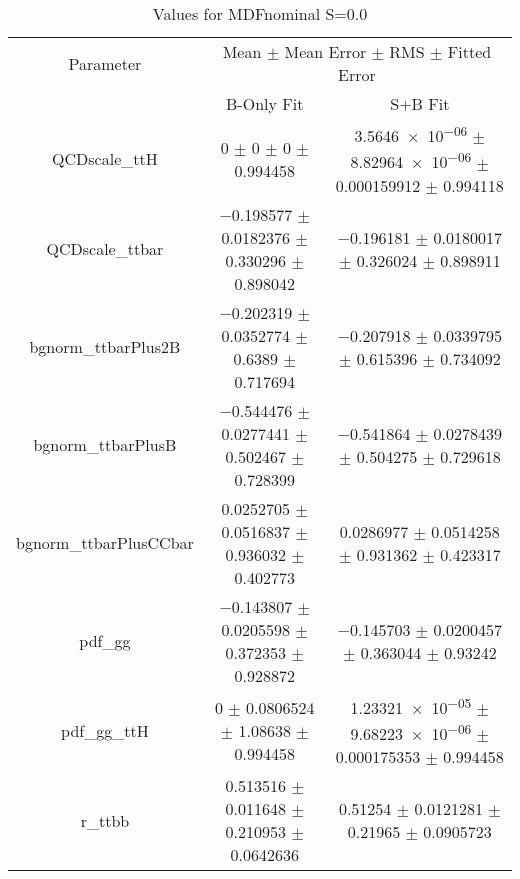 \begin{table}
\centering
\caption{Values for MDFnominal S=0.0}
\begin{tabular}{ccc}
\toprule
Parameter & \multicolumn{2}{c}{Mean $\pm$ Mean Error $\pm$ RMS $\pm$ Fitted Error}\\
 & B-Only Fit & S+B Fit\\
\midrule
QCDscale\_ttH & \num{0} $\pm$ \num{0} $\pm$ \num{0} $\pm$ \num{0.994458} & \num{3.5646e-06} $\pm$ \num{8.82964e-06} $\pm$ \num{0.000159912} $\pm$ \num{0.994118}\\
QCDscale\_ttbar & \num{-0.198577} $\pm$ \num{0.0182376} $\pm$ \num{0.330296} $\pm$ \num{0.898042} & \num{-0.196181} $\pm$ \num{0.0180017} $\pm$ \num{0.326024} $\pm$ \num{0.898911}\\
bgnorm\_ttbarPlus2B & \num{-0.202319} $\pm$ \num{0.0352774} $\pm$ \num{0.6389} $\pm$ \num{0.717694} & \num{-0.207918} $\pm$ \num{0.0339795} $\pm$ \num{0.615396} $\pm$ \num{0.734092}\\
bgnorm\_ttbarPlusB & \num{-0.544476} $\pm$ \num{0.0277441} $\pm$ \num{0.502467} $\pm$ \num{0.728399} & \num{-0.541864} $\pm$ \num{0.0278439} $\pm$ \num{0.504275} $\pm$ \num{0.729618}\\
bgnorm\_ttbarPlusCCbar & \num{0.0252705} $\pm$ \num{0.0516837} $\pm$ \num{0.936032} $\pm$ \num{0.402773} & \num{0.0286977} $\pm$ \num{0.0514258} $\pm$ \num{0.931362} $\pm$ \num{0.423317}\\
pdf\_gg & \num{-0.143807} $\pm$ \num{0.0205598} $\pm$ \num{0.372353} $\pm$ \num{0.928872} & \num{-0.145703} $\pm$ \num{0.0200457} $\pm$ \num{0.363044} $\pm$ \num{0.93242}\\
pdf\_gg\_ttH & \num{0} $\pm$ \num{0.0806524} $\pm$ \num{1.08638} $\pm$ \num{0.994458} & \num{1.23321e-05} $\pm$ \num{9.68223e-06} $\pm$ \num{0.000175353} $\pm$ \num{0.994458}\\
r\_ttbb & \num{0.513516} $\pm$ \num{0.011648} $\pm$ \num{0.210953} $\pm$ \num{0.0642636} & \num{0.51254} $\pm$ \num{0.0121281} $\pm$ \num{0.21965} $\pm$ \num{0.0905723}\\
\bottomrule
\end{tabular}
\end{table}